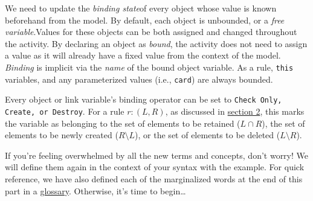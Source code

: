 We need to update the \emph{binding state}of every object whose value is known beforehand from the model. By default, each object is
unbounded, or a \emph{free variable}.Values for these objects can be both assigned and changed throughout the activity. By declaring
an object as \emph{bound}, the activity does not need to assign a value as it will already have a fixed value from the context of the model. \emph{Binding} is
implicit via the \emph{name} of the bound object variable. As a rule, \texttt{this} variables, and any parameterized values (i.e.,
\texttt{card}) are always bounded.

Every object or link variable's binding operator can be set to \texttt{Check Only, Create, or Destroy}. For a rule $r: (L, R)$, as discussed in
\hyperlink{explanation}{section 2}, this marks the variable as belonging to the set of elements to be retained ($L\cap R$), the set of elements to be newly
created ($R\setminus L$), or the set of elements to be deleted ($L\setminus R$).

If you're feeling overwhelmed by all the new terms and concepts, don't worry! We will define them again in the context of your syntax with the example. For
quick reference, we have also defined each of the marginalized words at the end of this part in a \hyperlink{glossary}{glossary}. Otherwise, it's time
to begin\ldots






